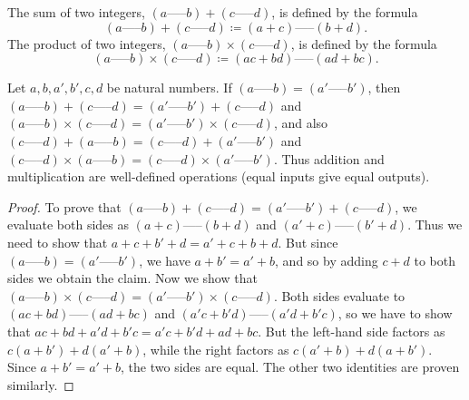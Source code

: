 \begin{definition}\label{4.1.2}
The sum of two integers, \((a \text{-----} b) + (c \text{-----} d)\), is defined by the formula
\[
    (a \text{-----} b) + (c \text{-----} d) \coloneqq (a + c) \text{-----} (b + d).
\]
The product of two integers, \((a \text{-----} b) \times (c \text{-----} d)\), is defined by the formula
\[
    (a \text{-----} b) \times (c \text{-----} d) \coloneqq (ac + bd) \text{-----} (ad + bc).
\]
\end{definition}

\begin{lemma}\label{4.1.3}
Let \(a, b, a', b', c, d\) be natural numbers.
If \((a \text{-----} b) = (a' \text{-----} b')\), then \((a \text{-----} b) + (c \text{-----} d) = (a' \text{-----} b') + (c \text{-----} d)\) and \((a \text{-----} b) \times (c \text{-----} d) = (a' \text{-----} b') \times (c \text{-----} d)\), and also \((c \text{-----} d) + (a \text{-----} b) = (c \text{-----} d) + (a' \text{-----} b')\) and \((c \text{-----} d) \times (a \text{-----} b) = (c \text{-----} d) \times (a' \text{-----} b')\).
Thus addition and multiplication are well-defined operations (equal inputs give equal outputs).
\end{lemma}

\begin{proof}
To prove that \((a \text{-----} b) + (c \text{-----} d) = (a' \text{-----} b') + (c \text{-----} d)\), we evaluate both sides as \((a + c) \text{-----} (b + d)\) and \((a' + c) \text{-----} (b' + d)\).
Thus we need to show that \(a + c + b' + d = a' + c + b + d\).
But since \((a \text{-----} b) = (a' \text{-----} b')\), we have \(a + b' = a' + b\), and so by adding \(c + d\) to both sides we obtain the claim.
Now we show that \((a \text{-----} b) \times (c \text{-----} d) = (a' \text{-----} b') \times (c \text{-----} d)\).
Both sides evaluate to \((ac + bd) \text{-----} (ad + bc)\) and \((a'c + b'd) \text{-----} (a'd + b'c)\), so we have to show that \(ac + bd + a'd + b'c = a'c + b'd + ad + bc\).
But the left-hand side factors as \(c(a + b') + d(a' + b)\), while the right factors as \(c(a' + b) + d(a + b')\).
Since \(a + b' = a' + b\), the two sides are equal.
The other two identities are proven similarly.
\end{proof}

